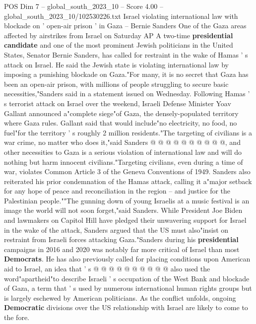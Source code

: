 \begin{textsample}{POS Dim 7 – global\_south\_2023\_10 – Score 4.00 – global\_south\_2023\_10/102530226.txt}  \label{ex:f7_pos_393}
Israel violating international law with blockade on ' open-air prison ' in Gaza -- Bernie Sanders One of the Gaza areas affected by airstrikes from Israel on Saturday AP A two-time \textbf{presidential} \textbf{candidate} and one of the most prominent Jewish politicians in the United States, Senator Bernie Sanders, has called for restraint in the wake of Hamas ' s attack on Israel.
He said the Jewish state is violating international law by imposing a punishing blockade on Gaza."For many, it is no secret that Gaza has been an open-air prison, with millions of people struggling to secure basic necessities,"Sanders said in a statement issued on Wednesday.
Following Hamas ' s terrorist attack on Israel over the weekend, Israeli Defense Minister Yoav Gallant announced a"complete siege"of Gaza, the densely-populated territory where Gaza rules.
Gallant said that would include"no electricity, no food, no fuel"for the territory ' s roughly 2 million residents."The targeting of civilians is a war crime, no matter who does it,"said Sanders @ @ @ @ @ @ @ @ @ @, and other necessities to Gaza is a serious violation of international law and will do nothing but harm innocent civilians."Targeting civilians, even during a time of war, violates Common Article 3 of the Geneva Conventions of 1949.
Sanders also reiterated his prior condemnation of the Hamas attack, calling it a"major setback for any hope of peace and reconciliation in the region -- and justice for the Palestinian people.""The gunning down of young Israelis at a music festival is an image the world will not soon forget,"said Sanders.
While President Joe Biden and lawmakers on Capitol Hill have pledged their unwavering support for Israel in the wake of the attack, Sanders argued that the US must also"insist on restraint from Israeli forces attacking Gaza."Sanders during his \textbf{presidential} campaigns in 2016 and 2020 was notably far more critical of Israel than most \textbf{Democrats}.
He has also previously called for placing conditions upon American aid to Israel, an idea that ' s @ @ @ @ @ @ @ @ @ @ also used the word"apartheid"to describe Israeli ' s occupation of the West Bank and blockade of Gaza, a term that ' s used by numerous international human rights groups but is largely eschewed by American politicians.
As the conflict unfolds, ongoing \textbf{Democratic} divisions over the US relationship with Israel are likely to come to the fore.

\end{textsample}
